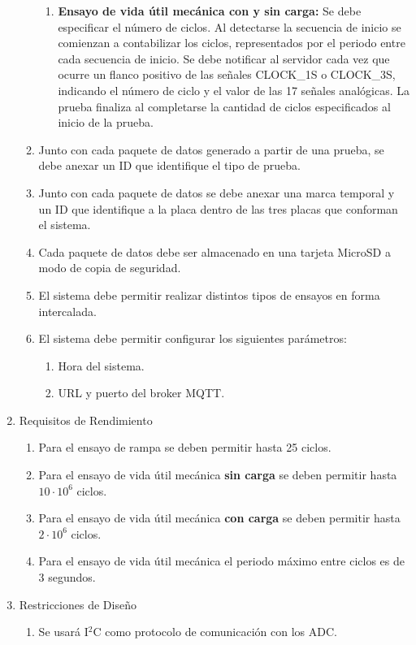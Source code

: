\documentclass[11pt]{charter}
\begin{document}
\begin{enumerate}
\begin{enumerate}
\begin{enumerate}
		\item \textbf{Ensayo de vida útil mecánica con y sin carga:} Se debe especificar el número de ciclos. Al detectarse la secuencia de inicio se comienzan a contabilizar los ciclos, representados por el periodo entre cada secuencia de inicio. Se debe notificar al servidor cada vez que ocurre un flanco positivo de las señales CLOCK\_1S o CLOCK\_3S, indicando el número de ciclo y el valor de las 17 señales analógicas. La prueba finaliza al completarse la cantidad de ciclos especificados al inicio de la prueba.
		\end{enumerate}
	\item Junto con cada paquete de datos generado a partir de una prueba, se debe anexar un ID que identifique el tipo de prueba.
	\item Junto con cada paquete de datos se debe anexar una marca temporal y un ID que identifique a la placa dentro de las tres placas que conforman el sistema.
	\item Cada paquete de datos debe ser almacenado en una tarjeta MicroSD a modo de copia de seguridad.
	\item El sistema debe permitir realizar distintos tipos de ensayos en forma intercalada.
	\item El sistema debe permitir configurar los siguientes parámetros:
		\begin{enumerate}
		\item Hora del sistema.
		\item URL y puerto del broker MQTT.
		\end{enumerate}
	\end{enumerate}
\item Requisitos de Rendimiento
	\begin{enumerate}
	\item Para el ensayo de rampa se deben permitir hasta 25 ciclos.
	\item Para el ensayo de vida útil mecánica \textbf{sin carga} se deben permitir hasta $10 \cdot 10^6$ ciclos.
	\item Para el ensayo de vida útil mecánica \textbf{con carga} se deben permitir hasta $2 \cdot 10^6$ ciclos.
	\item Para el ensayo de vida útil mecánica el periodo máximo entre ciclos es de 3 segundos.
	\end{enumerate}
\item Restricciones de Diseño
	\begin{enumerate}
	\item Se usará I$^2$C como protocolo de comunicación con los ADC.

\end{enumerate}
\end{enumerate}
\end{document}
